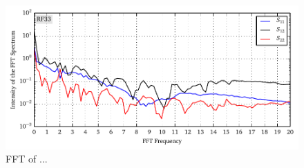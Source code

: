 \begin{figure}
 \centering
 \includegraphics{figs/active/RF33-fft.pdf}
 \caption{FFT of ...}
\end{figure}






% 
% 	      
% 
% 
% 

